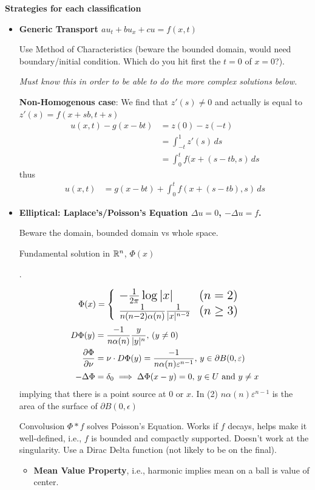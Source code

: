 \documentclass[12pt,a4paper]{report}
\begin{document}
{\begin{description}
\begin{itemize}
\end{itemize}
	\textbf{Strategies for each classification}
	\begin{itemize}
		\item \textbf{Generic Transport $au_t+bu_x+ cu=f(x,t)$}
		
		Use Method of Characteristics (beware the bounded domain, would need boundary/initial condition.  Which do you hit first the $t=0$ of $x=0$?).
		
		\textit{Must know this in order to be able to do the more complex solutions below.}
		
		\textbf{Non-Homogenous case}: We find that $z'(s) \ne 0$ and actually is equal to $z'(s) = f(x+sb, t+s)$
	\begin{align*}
		u(x,t)-g(x-bt) &= z(0)-z(-t)\\
		&= \int_{-t}^1 z'(s)\, ds \\
		&= \int_0^t f(x+(s-tb,s)\,ds
	\end{align*}thus
	\begin{align*}
		u(x,t) &= g(x-bt) +\int_0^t f(x+(s-tb),s)\,ds
	\end{align*}
		
		\item \textbf{Elliptical: Laplace's/Poisson's Equation $\Delta u=0$, $-\Delta u=f$.}
		
		Beware the domain, bounded domain vs whole space.
		
		Fundamental solution in $\mathbb{R}^n$, $\Phi(x)$
		
\begin{remark}.

\begin{align*}
	\Phi(x) &= \Large\left \{ \begin{array}{ll} -\frac{1}{2\pi}\log |x| & (n=2)\\ \frac{1}{n(n-2)\alpha(n)}\frac{1}{|x|^{n-2}} & (n\ge 3) \end{array} \right . 
\end{align*}
\begin{align}
	D\Phi(y) &= \frac{-1}{n\alpha(n)}\frac{y}{|y|^n},\, (y\ne 0)\\
	\frac{\partial \Phi}{\partial \nu} &= \nu\cdot D\Phi(y)= \frac{-1}{n\alpha(n)\varepsilon^{n-1}},\, y \in \partial B(0,\varepsilon)  \\
	-\Delta\Phi &= \delta_0 \implies \Delta\Phi(x-y)=0,\, y \in U \text{ and } y \ne x
\end{align}implying that there is a point source at 0 or $x$. In (2) $n\alpha(n)\varepsilon^{n-1}$ is the area of the surface of $\partial B(0,\epsilon)$

\end{remark}
		Convolusion $\Phi * f$ solves Poisson's Equation.  Works if $f$ decays, helps make it well-defined, i.e., $f$ is bounded and compactly supported.  Doesn't work at the singularity. Use a Dirac Delta function (not likely to be on the final).
		\begin{itemize}
			\item \textbf{Mean Value Property}, i.e., harmonic implies mean on a ball is value of center.
			

\end{itemize}
\end{itemize}
\end{description}}
\end{document}
